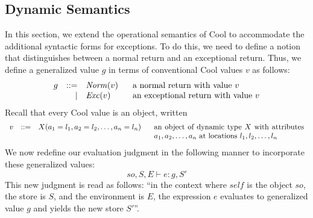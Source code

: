 \documentclass[11pt]{article}
\makeatletter
\newcommand{\MVar}[1]{\ensuremath{\mathit{#1}}\xspace}
\newcommand{\Bnfdef}{\mathrel{::=}}
\newcommand{\Bnfalt}{\mid}
\def\@add#1#2{
 \newcount\tmp
 \tmp=#1
 \advance\tmp by #2
 \number\tmp
}
\newcommand{\List}[3]{\ensuremath{
  {#1}_{#2},{#1}_{\@add{#2}{1}},\ldots,{#1}_{#3}
}}
\makeatother
\begin{document}
\subsection{Dynamic Semantics}

\newcommand{\Norm}[1]{\ensuremath{\MVar{Norm}(#1)}\xspace}
\newcommand{\Exc}[1]{\ensuremath{\MVar{Exc}(#1)}\xspace}

\newcommand{\Int}[1]{\ensuremath{\MVar{Int}(#1)}\xspace}

\newcommand{\Eval}[6]{\ensuremath{{#1},{#2},{#3} \vdash {#4} : {#5}, {#6}}\xspace}

\newcommand{\so}{\MVar{so}}
\newcommand{\op}{\MVar{op}}

\newcommand{\Id}{\MVar{Id}}

In this section, we extend the operational semantics of Cool to
accommodate the additional syntactic forms for exceptions.  To do this,
we need to define a notion that distinguishes between a normal return
and an exceptional return.  Thus, we define a generalized value $g$ in
terms of conventional Cool values $v$ as follows:
\[ \begin{array}{crl@{\extracolsep{4ex}}l}
  g & \Bnfdef & \Norm{v} & \mbox{a normal return with value $v$} \\
    & \Bnfalt & \Exc{v} & \mbox{an exceptional return with value $v$}
\end{array} \]
Recall that every Cool value is an object, written
\[ \begin{array}{crl@{\extracolsep{4ex}}p{20em}}
  v & \Bnfdef & X(a_1 = l_1, a_2 = l_2, \ldots, a_n = l_n) &
    an object of dynamic type $X$ with attributes
    $\List a 1 n$ at locations $\List l 1 n$ \\
\end{array} \]
We now redefine our evaluation judgment in the following manner to
incorporate these generalized values:
\[
  \Eval \so S E  e g {S'}
\]
This new judgment is read as follows: ``in the context where \MVar{self}
is the object \so, the
store is $S$, and the environment is $E$, the expression $e$ evaluates
to generalized value $g$ and yields the new store $S'$''.
\end{document}
